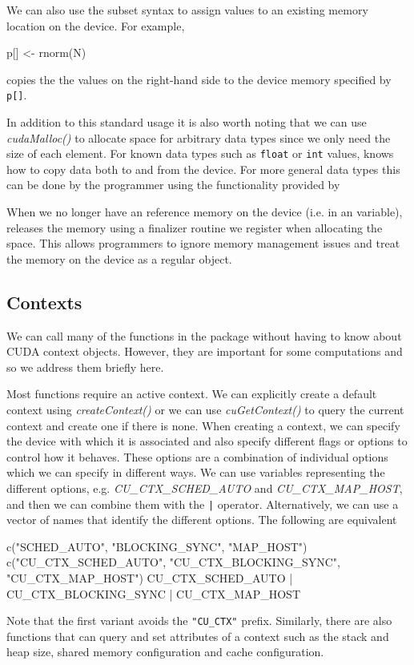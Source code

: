\documentclass[article]{jss}
\def\R{\proglang{R}}
\def\Rpkg#1{\pkg{#1}}
\def\Rfunc#1{\textsl{#1()}}
\def\Rop#1{\texttt{#1}}
\def\Rvar#1{\textsl{#1}}
\def\Ctype#1{\texttt{#1}}
\begin{document}
We can also use the subset syntax to assign values to an existing
memory location on the device. For example, 
\begin{RCode}
p[] <- rnorm(N)
\end{RCode}
copies the the values on the right-hand side to the device memory 
specified by \texttt{p[]}.

In addition to this standard usage it is also worth noting that we can
use \Rfunc{cudaMalloc} to allocate space for arbitrary data
types since we only need the size of each element. For known data types
such as \Ctype{float} or \Ctype{int} values, \Rpkg{RCUDA} knows how to
copy data both to and from the device. For more general data types
this can be done by the \R{} programmer using the functionality 
provided by \Rpkg{RCUDA} 

When we no longer have an \R{} reference memory on the device (i.e. in
an \R{} variable), \R{} releases the memory using a finalizer routine
we register when allocating the space.  This allows \R{} programmers
to ignore memory management issues and treat the memory on the device
as a regular \R{} object.



\subsection{Contexts}\label{subsec:Contexts}
We can call many of the functions in the \Rpkg{RCUDA}  package
without having to know about CUDA context objects.
However, they are important for some computations and so we 
address them briefly here.

Most \Rpkg{RCUDA} functions require an active context.  We can
explicitly create a default context using \Rfunc{createContext} or we
can use \Rfunc{cuGetContext} to query the current context and create
one if there is none.  When creating a context, we can specify the
device with which it is associated and also specify different flags or
options to control how it behaves.  These options are a combination of
individual options which we can specify in different ways. 
We can use \R{} variables representing the different options, e.g.
\Rvar{CU_CTX\_SCHED\_AUTO} and \Rvar{CU\_CTX\_MAP\_HOST},
and then we can combine them with the \Rop{|} operator. 
Alternatively, we can use a vector of names that identify the
different options. 
The following are equivalent
\begin{RCode}
c("SCHED_AUTO", "BLOCKING_SYNC", "MAP_HOST")
c("CU_CTX_SCHED_AUTO", "CU_CTX_BLOCKING_SYNC", "CU_CTX_MAP_HOST")
CU_CTX_SCHED_AUTO | CU_CTX_BLOCKING_SYNC | CU_CTX_MAP_HOST
\end{RCode}
Note that the first variant avoids the \texttt{"CU_CTX"} prefix.
Similarly, there are also functions that can query and set attributes of a
context such as the stack and heap size, shared memory configuration
and cache configuration.
\end{document}
